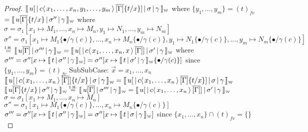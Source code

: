 \documentclass[a4paper,UKenglish,cleveref, autoref]{lipics-v2019}
\newcommand{\fv}[1]{(#1)_{fv}}
\newcommand{\set}[1]{ \{ #1 \} }
\newcommand{\dist}[5]{#1 [ #2 \, \vert \, \fakedist{#4}{#5} \, #3 ]}
\newcommand{\fakedist}[2]{#1 \langle \, #2 \, \rangle}
\newcommand{\sub}[3]{#1 \{ #2 / #3 \}}
\newcommand{\weaksymbol}{\mbox{\tiny $\mathcal{W}$}}
\newcommand{\readweakwmap}[3]{\llbracket \, #1 \, \vert \, #2 \, \vert \, #3  \, \rrbracket_{\weaksymbol} }
\newcommand{\IH}{\stackrel{\hbox{\tiny I.H.}}{\hbox{=}}}
\begin{document}
\begin{proof}
\newline
$\readweakwmap{\dist{u}{}{\overline{[\Gamma]}  \sub{}{t}{x}}{c}{x_{1}, \dots, x_{n}, y_{1}, \dots, y_{m}}}{\sigma}{\gamma}$
\newline
where $\set{y_{1}, \dots, y_{m}} = \fv{t}$
\newline
$= \readweakwmap{u \overline{[\Gamma]} \sub{}{t}{x}}{\sigma''}{\gamma}$
\newline
where 
\newline
$\sigma = \sigma_{1}[x_{1} \mapsto M_{1}, \dots, x_{n} \mapsto M_{n}, y_{1} \mapsto N_{1}, \dots, y_{m} \mapsto N_{m}]$
\newline
$\sigma'' = \sigma_{1} [ x_{1} \mapsto M_{1} \sub{}{\bullet}{\gamma(c)}, \dots, x_{n} \mapsto M_{n}\sub{}{\bullet}{\gamma(c)}, y_{1} \mapsto N_{1}\sub{}{\bullet}{\gamma(c)}, \dots, y_{m} \mapsto N_{m}\sub{}{\bullet}{\gamma(c)} ] $
\newline
$\IH \readweakwmap{u \overline{[\Gamma]} }{\sigma'''}{\gamma} = \readweakwmap{\dist{u}{}{\overline{[\Gamma]}}{c}{x_{1}, \dots, x_{n}, x}}{\sigma'}{\gamma}$
\newline
where
$\sigma''' = \sigma'' [x \mapsto \readweakwmap{t}{\sigma''}{\gamma}] = \sigma'' [x \mapsto \readweakwmap{t}{\sigma'}{\gamma} \sub{}{\bullet}{\gamma(c)}]$
\newline
since $\set{y_{1}, \dots, y_{m}} = \fv{t}$
\newline
\newline
\indent \indent SubSubCase: $\vec{x} = x_{1}, \dots, x_{n}$
\newline
$\readweakwmap{\dist{u}{}{\overline{[\Gamma]}}{c}{x_{1}, \dots, x_{n}} \sub{}{t}{x}}{\sigma}{\gamma} = \readweakwmap{\dist{u}{}{\overline{[\Gamma]} \sub{}{t}{x} }{c}{x_{1}, \dots, x_{n}} }{\sigma}{\gamma}$
\newline
$\readweakwmap{u \overline{[\Gamma]} \sub{}{t}{x}}{\sigma''}{\gamma} \IH \readweakwmap{u \overline{[\Gamma]}}{\sigma'''}{\gamma} = \readweakwmap{\dist{u}{}{\overline{[\Gamma]}}{c}{x_{1}, \dots, x_{n}} }{\sigma'}{\gamma} $
\newline
$\sigma = \sigma_{1} [x_{1} \mapsto M_{1}, \dots, x_{n} \mapsto M_{n}]$
\newline
$\sigma'' = \sigma_{1} [x_{1} \mapsto M_{1} \sub{}{\bullet}{\gamma(c)}, \dots, x_{n} \mapsto M_{n} \sub{}{\bullet}{\gamma(c)}]$
\newline
$\sigma''' = \sigma'' [x \mapsto \readweakwmap{t}{\sigma''}{\gamma}] = \sigma'' [x \mapsto \readweakwmap{t}{\sigma}{\gamma}]$
\newline
since $\set{x_{1}, \dots, x_{n}} \cap \fv{t} = \set{}$
\end{proof}
\end{document}
